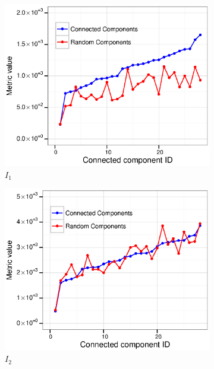 \documentclass[10pt,letterpaper]{article}
\begin{document}
\begin{figure}
  \centering
  \begin{subfigure}[b]{0.3\textwidth}
    \includegraphics[width=\textwidth]{figures_SI/Plots_from_data/cc_validation/I1.eps}
    \caption{$I_1$} \label{fig:I1}
  \end{subfigure}
  \begin{subfigure}[b]{0.3\textwidth}
    \includegraphics[width=\textwidth]{figures_SI/Plots_from_data/cc_validation/I2.eps}
    \caption{$I_2$} \label{fig:I2}
  \end{subfigure} ~ %
  \begin{subfigure}[b]{0.3\textwidth}

\end{subfigure}
\end{figure}
\end{document}

